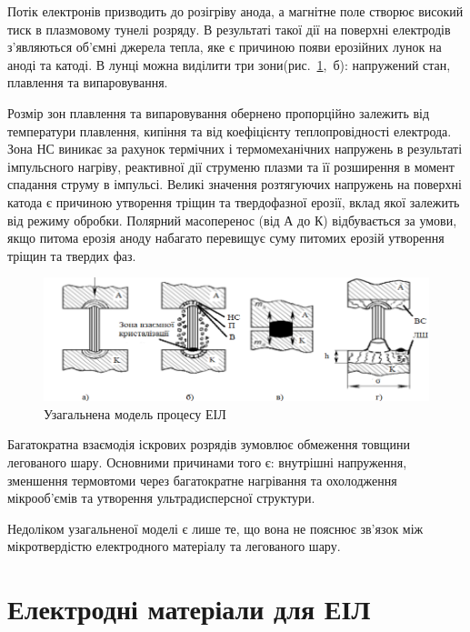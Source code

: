\documentclass[a4paper,fontsize=14bp,ukrainian]{extreport}
\begin{document}
Потік електронів призводить до розігріву анода, а магнітне поле створює високий тиск в плазмовому тунелі розряду. В результаті такої дії на поверхні електродів з'являються об'ємні джерела тепла, яке є причиною появи ерозійних лунок на аноді та катоді. В лунці можна виділити три зони(рис.~\ref{fig:schema_model-eil},~б): напружений стан, плавлення та випаровування.

Розмір зон плавлення та випаровування обернено пропорційно залежить від температури плавлення, кипіння та від коефіцієнту теплопровідності електрода. Зона НС виникає за рахунок термічних і термомеханічних напружень в результаті імпульсного нагріву, реактивної дії струменю плазми та її розширення в момент спадання струму в імпульсі. Великі значення розтягуючих напружень на поверхні катода є причиною утворення тріщин та твердофазної ерозії, вклад якої залежить від режиму обробки. Полярний масоперенос (від А до К) відбувається за умови, якщо питома ерозія аноду набагато перевищує суму питомих ерозій утворення тріщин та твердих фаз.~\cite{verkhoturov1988}

\begin{figure}[H]
\centering
\includegraphics[width=\textwidth]{schema_model-eil.png}
\caption{Узагальнена модель процесу ЕІЛ~\cite{yarkov2004}}
\label{fig:schema_model-eil}
\end{figure}

Багатократна взаємодія іскрових розрядів зумовлює обмеження товщини легованого шару. Основними причинами того є: внутрішні напруження, зменшення термовтоми через багатократне нагрівання та охолодження мікрооб'ємів та утворення ультрадисперсної структури.

Недоліком узагальненої моделі є лише те, що вона не пояснює зв'язок між мікротвердістю електродного матеріалу та легованого шару.

\section{Електродні матеріали для ЕІЛ}
\end{document}
